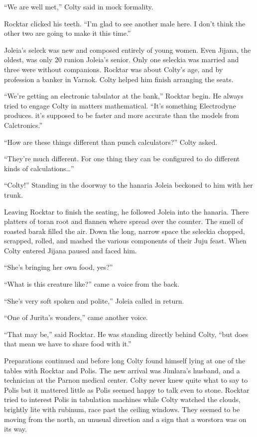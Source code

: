 ``We are well met,'' Colty said in mock formality.

Rocktar clicked his teeth. ``I'm glad to see another male here. I don't think the other two are
going to make it this time.''

Joleia's seleck was new and composed entirely of young women. Even Jijana, the oldest, was only
20 runion Joleia's senior. Only one seleckia was married and three were without companions.
Rocktar was about Colty's age, and by profession a banker in Varnok. Colty helped him finish
arranging the seats.

``We're getting an electronic tabulator at the bank,'' Rocktar begin. He always tried to engage
Colty in matters mathematical. ``It's something Electrodyne produces. it's supposed to be faster
and more accurate than the models from Calctronics.''

``How are these things different than punch calculators?'' Colty asked.

``They're much different. For one thing they can be configured to do different kinds of
calculations\ldots''

``Colty!'' Standing in the doorway to the hanaria Joleia beckoned to him with her trunk.

Leaving Rocktar to finish the seating, he followed Joleia into the hanaria. There platters of
toran root and flannen where spread over the counter. The smell of roasted barak filled the air.
Down the long, narrow space the seleckia chopped, scrapped, rolled, and mashed the various
components of their Juju feast. When Colty entered Jijana paused and faced him.

``She's bringing her own food, yes?''

``What is this creature like?'' came a voice from the back.

``She's very soft spoken and polite,'' Joleia called in return.

``One of Jurita's wonders,'' came another voice.

``That may be,'' said Rocktar. He was standing directly behind Colty, ``but does that mean we
have to share food with it.''

Preparations continued and before long Colty found himself lying at one of the tables with
Rocktar and Polis. The new arrival was Jimlara's husband, and a technician at the Parnon medical
center. Colty never knew quite what to say to Polis but it mattered little as Polis seemed happy
to talk even to stone. Rocktar tried to interest Polis in tabulation machines while Colty
watched the clouds, brightly lite with rubinum, race past the ceiling windows. They seemed to be
moving from the north, an unusual direction and a sign that a worstora was on its way.

